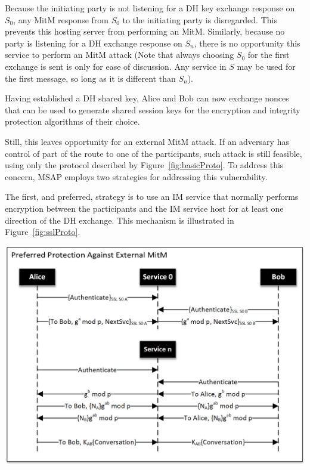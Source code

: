 \documentclass[twoside,10pt]{article}
\newenvironment{Figure}
  {\par\medskip\noindent\minipage{\linewidth}}
  {\endminipage\par\medskip}
\begin{document}
\begin{multicols}{2}
Because the initiating party is not listening for a DH key exchange response on $S_0$, any MitM response from $S_0$ to the initiating party is disregarded.  This prevents this hosting server from performing an MitM.  Similarly, because no party is listening for a DH exchange response on $S_n$, there is no opportunity this service to perform an MitM attack (Note that always choosing $S_0$ for the first exchange is sent is only for ease of discussion.  Any service in $S$ may be used for the first message, so long as it is different than $S_n$).

Having established a DH shared key, Alice and Bob can now exchange nonces that can be used to generate shared session keys for the encryption and integrity protection algorithms of their choice.

Still, this leaves opportunity for an external MitM attack.  If an adversary has control of part of the route to one of the participants, such attack is still feasible, using only the protocol described by Figure~\ref{fig:basicProto}.  To address this concern, MSAP employs two strategies for addressing this vulnerability.

The first, and preferred, strategy is to use an IM service that normally performs encryption between the participants and the IM service host for at least one direction of the DH exchange.  This mechanism is illustrated in Figure~\ref{fig:sslProto}.
\begin{Figure}
  \centering
  \includegraphics[width=\textwidth]{SSLOnlyDiagramBW.png}
  \label{fig:sslProto}
\end{Figure}


\end{multicols}
\end{document}
